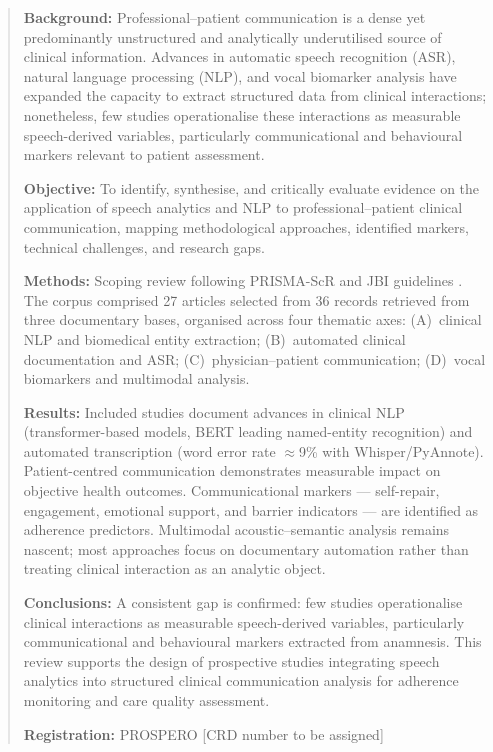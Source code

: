 \documentclass[a4paper,fleqn]{cas-sc}
\begin{document}
\begin{abstract}
\textbf{Background:}
Professional–patient communication is a dense yet predominantly unstructured
and analytically underutilised source of clinical information. Advances in
automatic speech recognition (ASR), natural language processing (NLP), and
vocal biomarker analysis have expanded the capacity to extract structured data
from clinical interactions; nonetheless, few studies operationalise these
interactions as measurable speech-derived variables, particularly
communicational and behavioural markers relevant to patient assessment.

\textbf{Objective:}
To identify, synthesise, and critically evaluate evidence on the application
of speech analytics and NLP to professional–patient clinical communication,
mapping methodological approaches, identified markers, technical challenges,
and research gaps.

\textbf{Methods:}
Scoping review following PRISMA-ScR \citep{Tricco2018} and JBI guidelines
\citep{Peters2020}. The corpus comprised 27 articles selected from 36 records
retrieved from three documentary bases, organised across four thematic axes:
(A)~clinical NLP and biomedical entity extraction; (B)~automated clinical
documentation and ASR; (C)~physician–patient communication; (D)~vocal
biomarkers and multimodal analysis.

\textbf{Results:}
Included studies document advances in clinical NLP (transformer-based models,
BERT leading named-entity recognition) and automated transcription (word error
rate $\approx$9\% with Whisper/PyAnnote). Patient-centred communication
demonstrates measurable impact on objective health outcomes. Communicational
markers — self-repair, engagement, emotional support, and barrier indicators —
are identified as adherence predictors. Multimodal acoustic–semantic analysis
remains nascent; most approaches focus on documentary automation rather than
treating clinical interaction as an analytic object.

\textbf{Conclusions:}
A consistent gap is confirmed: few studies operationalise clinical interactions
as measurable speech-derived variables, particularly communicational and
behavioural markers extracted from anamnesis. This review supports the design
of prospective studies integrating speech analytics into structured clinical
communication analysis for adherence monitoring and care quality assessment.

\textbf{Registration:} PROSPERO [CRD number to be assigned]
\end{abstract}
\end{document}
